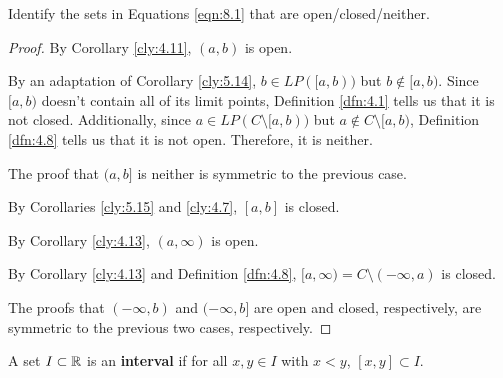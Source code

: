 \documentclass[../main.tex]{subfiles}
\begin{document}
\begin{exercise}\label{exr:8.1}
    Identify the sets in Equations \ref{eqn:8.1} that are open/closed/neither.
    \begin{proof}
        By Corollary \ref{cly:4.11}, $(a,b)$ is open.\par
        By an adaptation of Corollary \ref{cly:5.14}, $b\in LP([a,b))$ but $b\notin[a,b)$. Since $[a,b)$ doesn't contain all of its limit points, Definition \ref{dfn:4.1} tells us that it is not closed. Additionally, since $a\in LP(C\setminus[a,b))$ but $a\notin C\setminus[a,b)$, Definition \ref{dfn:4.8} tells us that it is not open. Therefore, it is neither.\par
        The proof that $(a,b]$ is neither is symmetric to the previous case.\par
        By Corollaries \ref{cly:5.15} and \ref{cly:4.7}, $[a,b]$ is closed.\par
        By Corollary \ref{cly:4.13}, $(a,\infty)$ is open.\par
        By Corollary \ref{cly:4.13} and Definition \ref{dfn:4.8}, $[a,\infty)=C\setminus(-\infty,a)$ is closed.\par
        The proofs that $(-\infty,b)$ and $(-\infty,b]$ are open and closed, respectively, are symmetric to the previous two cases, respectively.
    \end{proof}
\end{exercise}

\begin{definition}\label{dfn:8.2}
    A set $I\subset\mathbb{R}$ is an \textbf{interval} if for all $x,y\in I$ with $x<y$, $[x,y]\subset I$.
\end{definition}
\end{document}

